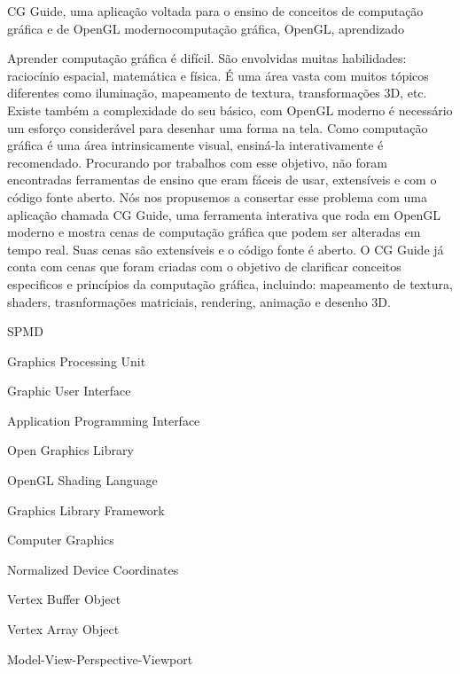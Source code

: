 \documentclass[cic,tc,english]{iiufrgs}
\begin{document}
\begin{englishabstract}{CG Guide, uma aplicação voltada para o ensino de conceitos de computação gráfica e de OpenGL moderno}{computação gráfica, OpenGL, aprendizado}

    Aprender computação gráfica é difícil. São envolvidas muitas habilidades: raciocínio espacial, matemática e física. É uma área vasta com muitos tópicos diferentes como iluminação, mapeamento de textura, transformações 3D, etc. Existe também a complexidade do seu básico, com OpenGL moderno é necessário um esforço considerável para desenhar uma forma na tela. Como computação gráfica é uma área intrinsicamente visual, ensiná-la interativamente é recomendado. Procurando por trabalhos com esse objetivo, não foram encontradas ferramentas de ensino que eram fáceis de usar, extensíveis e com o código fonte aberto. Nós nos propusemos a consertar esse problema com uma aplicação chamada CG Guide, uma ferramenta interativa que roda em OpenGL moderno e mostra cenas de computação gráfica que podem ser alteradas em tempo real. Suas cenas são extensíveis e o código fonte é aberto. O CG Guide já conta com cenas que foram criadas com o objetivo de clarificar conceitos especificos e princípios da computação gráfica, incluindo: mapeamento de textura, shaders, trasnformações matriciais, rendering, animação e desenho 3D.
\end{englishabstract}

\listoffigures


\begin{listofabbrv}{SPMD}
    \item[GPU] Graphics Processing Unit
    \item[GUI] Graphic User Interface
    \item[API] Application Programming Interface
    \item[OpenGL] Open Graphics Library
    \item[GLSL] OpenGL Shading Language
    \item[GLFW] Graphics Library Framework
    \item[CG] Computer Graphics
    \item[NDC] Normalized Device Coordinates
    \item[VBO] Vertex Buffer Object
    \item[VAO] Vertex Array Object
    \item[MVPV] Model-View-Perspective-Viewport
\end{listofabbrv}
\end{document}
